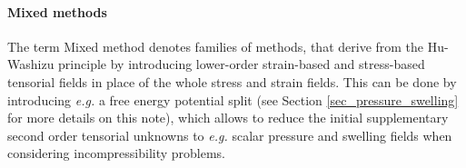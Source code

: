 

\paragraph{Mixed methods}

The term Mixed method denotes families of methods, that derive from the Hu-Washizu principle by introducing lower-order strain-based and stress-based tensorial fields
in place of the whole stress and strain fields. This can be done by introducing \textit{e.g.} a free energy potential split \cite{malkus_mixed_1978, al-akhrass_methodes_nodate}
(see Section \ref{sec_pressure_swelling} for more details on this note),
which allows to reduce the initial supplementary second order tensorial unknowns to \textit{e.g.} scalar pressure and swelling fields when considering incompressibility problems.

